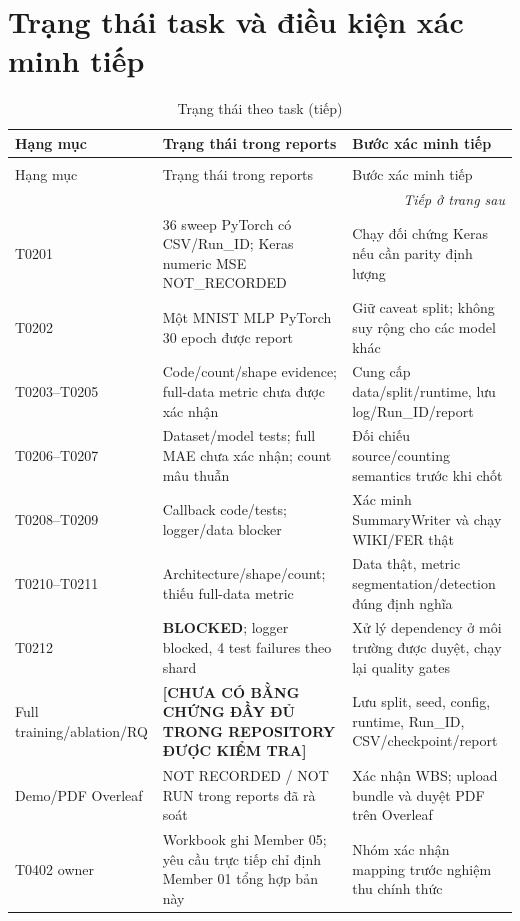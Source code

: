 \section{Trạng thái task và điều kiện xác minh tiếp}
\begin{longtable}{p{}p{}p{}}
\caption{Trạng thái theo task evidence đã rà soát}\label{tab:t0402-status}\\
\toprule Hạng mục & Trạng thái trong reports & Bước xác minh tiếp \\
\midrule
\endfirsthead
\caption[]{Trạng thái theo task (tiếp)}\\\toprule Hạng mục & Trạng thái trong reports & Bước xác minh tiếp \\
\midrule
\endhead
\midrule\multicolumn{3}{r}{\footnotesize\itshape Tiếp ở trang sau}\\
\endfoot
\bottomrule
\endlastfoot
T0201 & 36 sweep PyTorch có CSV/Run\_ID; Keras numeric MSE NOT\_RECORDED & Chạy đối chứng Keras nếu cần parity định lượng \\
T0202 & Một MNIST MLP PyTorch 30 epoch được report & Giữ caveat split; không suy rộng cho các model khác \\
T0203--T0205 & Code/count/shape evidence; full-data metric chưa được xác nhận & Cung cấp data/split/runtime, lưu log/Run\_ID/report \\
T0206--T0207 & Dataset/model tests; full MAE chưa xác nhận; count mâu thuẫn & Đối chiếu source/counting semantics trước khi chốt \\
T0208--T0209 & Callback code/tests; logger/data blocker & Xác minh SummaryWriter và chạy WIKI/FER thật \\
T0210--T0211 & Architecture/shape/count; thiếu full-data metric & Data thật, metric segmentation/detection đúng định nghĩa \\
T0212 & \textbf{BLOCKED}; logger blocked, 4 test failures theo shard & Xử lý dependency ở môi trường được duyệt, chạy lại quality gates \\
Full training/ablation/RQ & \textbf{[CHƯA CÓ BẰNG CHỨNG ĐẦY ĐỦ TRONG REPOSITORY ĐƯỢC KIỂM TRA]} & Lưu split, seed, config, runtime, Run\_ID, CSV/checkpoint/report \\
Demo/PDF Overleaf & NOT RECORDED / NOT RUN trong reports đã rà soát & Xác nhận WBS; upload bundle và duyệt PDF trên Overleaf \\
T0402 owner & Workbook ghi Member 05; yêu cầu trực tiếp chỉ định Member 01 tổng hợp bản này & Nhóm xác nhận mapping trước nghiệm thu chính thức \\
\end{longtable}

